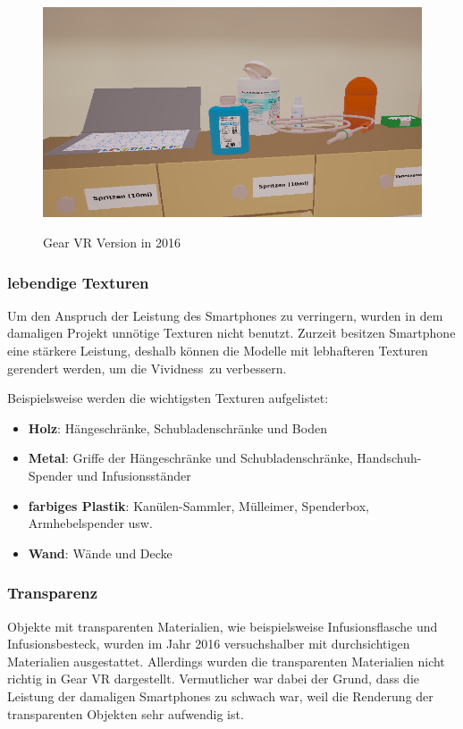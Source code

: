 \begin{figure}[ht]
\vspace*{1em}
\centering
\caption{Gear VR Version in 2016}
\includegraphics[width=\textwidth]{images/WithoutGlass.png}
\label{fig:WithoutGlass} 
\end{figure}
  
   \subsubsection{lebendige Texturen}
   
   Um den Anspruch der Leistung des Smartphones zu verringern, wurden in dem damaligen Projekt unnötige Texturen nicht benutzt. Zurzeit besitzen Smartphone eine stärkere Leistung, deshalb können die Modelle mit lebhafteren Texturen gerendert werden, um die \glqq Vividness\grqq\ zu verbessern.
   
   Beispielsweise werden die wichtigsten Texturen aufgelistet:
   \begin{itemize}
       \item \textbf{Holz}: Hängeschränke, Schubladenschränke und Boden
       \item \textbf{Metal}: Griffe der Hängeschränke und Schubladenschränke, Handschuh-Spender und Infusionsständer
       \item \textbf{farbiges Plastik}: Kanülen-Sammler, Mülleimer, Spenderbox, Armhebelspender usw.
       \item \textbf{Wand}: Wände und Decke
   \end{itemize}
   
   \subsubsection{Transparenz}
   Objekte mit transparenten Materialien, wie beispielsweise Infusionsflasche und Infusionsbesteck, wurden im Jahr 2016 versuchshalber mit durchsichtigen Materialien ausgestattet. Allerdings wurden die transparenten Materialien nicht richtig in Gear VR dargestellt. Vermutlicher war dabei der Grund, dass die Leistung der damaligen Smartphones zu schwach war, weil die Renderung der transparenten Objekten sehr aufwendig ist.
   

